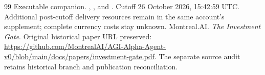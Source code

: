 \documentclass[11pt,a4paper]{article}
\begin{document}
\begin{thebibliography}{99}
 Executable companion. , , and . Cutoff 26 October 2026, 15:42:59 UTC. Additional post-cutoff delivery resources remain in the same account's supplement; complete currency costs stay unknown.
 Montreal.AI. \emph{The Investment Gate}. Original historical paper URL preserved: \url{https://github.com/MontrealAI/AGI-Alpha-Agent-v0/blob/main/docs/papers/investment-gate.pdf}. The separate source audit retains historical branch and publication reconciliation.
\end{thebibliography}
\end{document}
